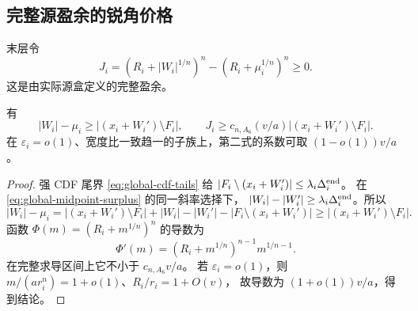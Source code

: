 \subsection{完整源盈余的锐角价格}

末层令
\[
 J_i=(R_i+|W_i|^{1/n})^n-(R_i+\mu_i^{1/n})^n\ge0.
\]
这是由实际源盒定义的完整盈余。
\begin{lemma}[有效端缺量的系数一]\label{sharp-fresh-cdf}
有
\begin{equation}\label{sharp-effective-missing}
 |W_i|-\mu_i\ge |(x_i+W_i')\setminus F_i|,\qquad
 J_i\ge c_{n,A_6}(v/a)|(x_i+W_i')\setminus F_i|.
\end{equation}
在 \(\varepsilon_i=o(1)\)、宽度比一致趋一的子族上，第二式的系数可取
\((1-o(1))v/a\)。
\end{lemma}
\begin{proof}
强 CDF 尾界 \eqref{eq:global-cdf-tails} 给
\(|F_i\setminus(x_i+W_i')|\le\lambda_i\Delta_i^{\rm end}\)。
在 \eqref{eq:global-midpoint-surplus} 的同一斜率选择下，
\(|W_i|-|W_i'|\ge\lambda_i\Delta_i^{\rm end}\)。所以
\[
 |W_i|-\mu_i
 =|(x_i+W_i')\setminus F_i|+|W_i|-|W_i'|
       -|F_i\setminus(x_i+W_i')|
 \ge |(x_i+W_i')\setminus F_i|.
\]
函数 \(\Phi(m)=(R_i+m^{1/n})^n\) 的导数为
\[
 \Phi'(m)=(R_i+m^{1/n})^{n-1}m^{1/n-1}.
\]
在完整求导区间上它不小于 \(c_{n,A_6}v/a\)。
若 \(\varepsilon_i=o(1)\)，则
\(m/(ar_i^n)=1+o(1)\)、\(R_i/r_i=1+O(v)\)，
故导数为 \((1+o(1))v/a\)，得到结论。
\end{proof}

